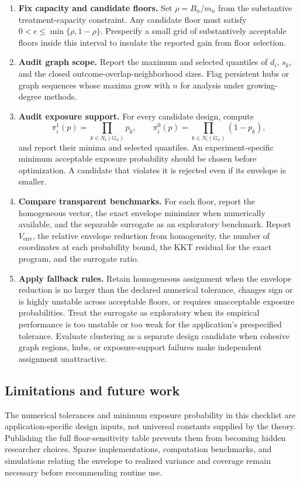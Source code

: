 \begin{enumerate}
\item \textbf{Fix capacity and candidate floors.} Set \(\rho=B_n/m_n\) from the substantive treatment-capacity constraint. Any candidate floor must satisfy \(0<\epsilon\leq\min\{\rho,1-\rho\}\). Prespecify a small grid of substantively acceptable floors inside this interval to insulate the reported gain from floor selection.
\item \textbf{Audit graph scope.} Report the maximum and selected quantiles of \(d_i\), \(s_k\), and the closed outcome-overlap-neighborhood sizes. Flag persistent hubs or graph sequences whose maxima grow with \(n\) for analysis under growing-degree methods.
\item \textbf{Audit exposure support.} For every candidate design, compute
\[
\pi_i^1(p)=\prod_{k\in N_i(G_n)}p_k,
\qquad
\pi_i^0(p)=\prod_{k\in N_i(G_n)}(1-p_k),
\]
and report their minima and selected quantiles. An experiment-specific minimum acceptable exposure probability should be chosen before optimization. A candidate that violates it is rejected even if its envelope is smaller.
\item \textbf{Compare transparent benchmarks.} For each floor, report the homogeneous vector, the exact envelope minimizer when numerically available, and the separable surrogate as an exploratory benchmark. Report \(V_{\mathrm{env}}\), the relative envelope reduction from homogeneity, the number of coordinates at each probability bound, the KKT residual for the exact program, and the surrogate ratio.
\item \textbf{Apply fallback rules.} Retain homogeneous assignment when the envelope reduction is no larger than the declared numerical tolerance, changes sign or is highly unstable across acceptable floors, or requires unacceptable exposure probabilities. Treat the surrogate as exploratory when its empirical performance is too unstable or too weak for the application's prespecified tolerance. Evaluate clustering as a separate design candidate when cohesive graph regions, hubs, or exposure-support failures make independent assignment unattractive.
\end{enumerate}

\subsection{Limitations and future work}

The numerical tolerances and minimum exposure probability in this checklist are application-specific design inputs, not universal constants supplied by the theory. Publishing the full floor-sensitivity table prevents them from becoming hidden researcher choices. Sparse implementations, computation benchmarks, and simulations relating the envelope to realized variance and coverage remain necessary before recommending routine use.

